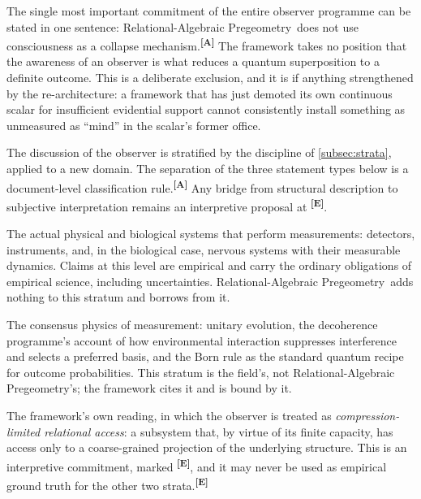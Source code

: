 \documentclass[12pt,a4paper,twoside]{article}
\theoremstyle{plain}
\theoremstyle{definition}
\theoremstyle{remark}
\newcommand{\ProjectShort}{Relational-Algebraic Pregeometry}
\newcommand{\RAP}{\ProjectShort}
\newcommand{\catmark}[1]{\textsuperscript{\textsf{\textbf{[#1]}}}}
\begin{document}
The single most important commitment of the entire observer programme
can be stated in one sentence: \RAP\ does not use consciousness as a
collapse mech\-a\-nism.\catmark{A} The framework takes no position that the
awareness of an observer is what reduces a quantum superposition to a
definite outcome. This is a deliberate exclusion, and it is if anything
strengthened by the re-architecture: a framework that has just demoted
its own continuous scalar for insufficient evidential support cannot
consistently install something as unmeasured as ``mind'' in the scalar's
former office.

The discussion of the observer is stratified by the discipline of
\cref{subsec:strata}, applied to a new domain. The separation of the
three statement types below is a document-level classification rule.\catmark{A}
Any bridge from structural description to subjective interpretation remains
an interpretive proposal at \catmark{E}.

\begin{description}[leftmargin=1.4em,style=nextline]
\item[Stratum~I: Empirical observer systems.] The actual physical and
biological systems that perform measurements: detectors, instruments,
and, in the biological case, nervous systems with their measurable
dynamics. Claims at this level are empirical and carry the ordinary
obligations of empirical science, including uncertainties. \RAP\ adds
nothing to this stratum and borrows from it.
\item[Stratum~II: Standard quantum and decoherence formalism.] The
consensus physics of measurement: unitary evolution, the decoherence
programme's account of how environmental interaction suppresses
interference and selects a preferred basis, and the Born rule as the
standard quantum recipe for outcome probabilities. This stratum is the
field's, not \RAP's; the framework cites it and is bound by it.
\item[Stratum~III: The \RAP\ interpretation.] The framework's own
reading, in which the observer is treated as \emph{compression-limited
relational access}: a subsystem that, by virtue of its finite capacity,
has access only to a coarse-grained projection of the underlying
structure. This is an interpretive commitment, marked \catmark{E}, and
it may never be used as empirical ground truth for the other two
strata.\catmark{E}
\end{description}
\end{document}
